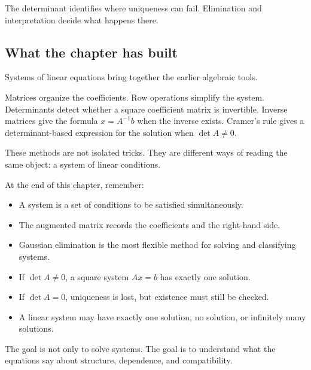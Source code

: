The determinant identifies where uniqueness can fail. Elimination and interpretation decide what happens there.

\subsection*{What the chapter has built}

Systems of linear equations bring together the earlier algebraic tools.

Matrices organize the coefficients. Row operations simplify the system. Determinants detect whether a square coefficient matrix is invertible. Inverse matrices give the formula \(x=A^{-1}b\) when the inverse exists. Cramer's rule gives a determinant-based expression for the solution when \(\det A\ne0\).

These methods are not isolated tricks. They are different ways of reading the same object: a system of linear conditions.

\begin{summarybox}
At the end of this chapter, remember:
\begin{itemize}
\item A system is a set of conditions to be satisfied simultaneously.
\item The augmented matrix records the coefficients and the right-hand side.
\item Gaussian elimination is the most flexible method for solving and classifying systems.
\item If \(\det A\ne0\), a square system \(Ax=b\) has exactly one solution.
\item If \(\det A=0\), uniqueness is lost, but existence must still be checked.
\item A linear system may have exactly one solution, no solution, or infinitely many solutions.
\end{itemize}
\end{summarybox}

The goal is not only to solve systems. The goal is to understand what the equations say about structure, dependence, and compatibility.